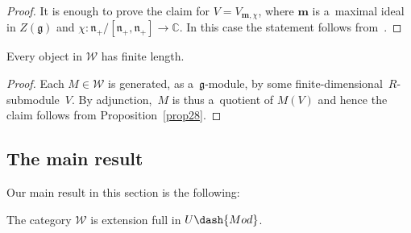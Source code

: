 \documentclass[pdftex]{sigma}
\begin{document}
\begin{proof}
It is enough to prove the claim for $V=V_{\mathbf{m},\chi}$, where $\mathbf{m}$ is a~maximal ideal in $Z(\mathfrak{g})$
and $\chi:\mathfrak{n}_+/[\mathfrak{n}_+,\mathfrak{n}_+]\to\mathbb{C}$.
In this case the statement follows from~\cite[Theorem~2.8]{McD}.
\end{proof}

\begin{corollary}
Every object in $\mathscr{W}$ has finite length.
\end{corollary}

{\sloppy
\begin{proof}
Each $M\in\mathscr{W}$ is generated, as a~$\mathfrak{g}$-module, by some f\/inite-dimensional~$R$-submo\-du\-le~$V$.
By adjunction,~$M$ is thus a~quotient of $M(V)$ and hence the claim follows from Proposi\-tion~\ref{prop28}.
\end{proof}

}

\subsection{The main result}%

Our main result in this section is the following:

\begin{theorem}
\label{thm31}
The category $\mathscr{W}$ is extension full in $U\dash{Mod}$.
\end{theorem}
\end{document}
